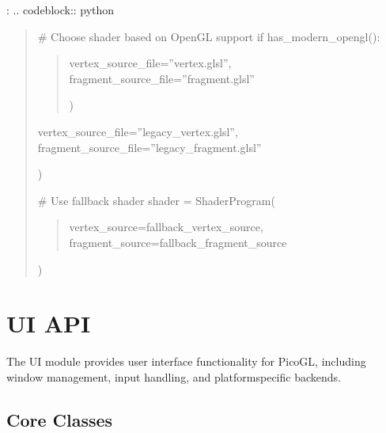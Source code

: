 \documentclass[a4paper,10pt,english,openany,oneside]{sphinxmanual}
\begin{document}
\sphinxAtStartPar
{}:
.. code\sphinxhyphen{}block:: python
\begin{quote}

\sphinxAtStartPar
\# Choose shader based on OpenGL support
if has\_modern\_opengl():
\begin{quote}
\begin{description}
\sphinxAtStartPar
vertex\_source\_file=”vertex.glsl”,
fragment\_source\_file=”fragment.glsl”

\end{description}

\sphinxAtStartPar
)
\end{quote}
\begin{description}
\begin{description}
\sphinxAtStartPar
vertex\_source\_file=”legacy\_vertex.glsl”,
fragment\_source\_file=”legacy\_fragment.glsl”

\end{description}

\sphinxAtStartPar
)

\sphinxAtStartPar
\# Use fallback shader
shader = ShaderProgram(
\begin{quote}

\sphinxAtStartPar
vertex\_source=fallback\_vertex\_source,
fragment\_source=fallback\_fragment\_source
\end{quote}

\sphinxAtStartPar
)

\end{description}
\end{quote}

\sphinxstepscope


\section{UI API}
\label{\detokenize{api/ui:ui-api}}\label{\detokenize{api/ui::doc}}
\sphinxAtStartPar
The UI module provides user interface functionality for PicoGL, including window management, input handling, and platform\sphinxhyphen{}specific backends.


\subsection{Core Classes}
\label{\detokenize{api/ui:core-classes}}
\end{document}
